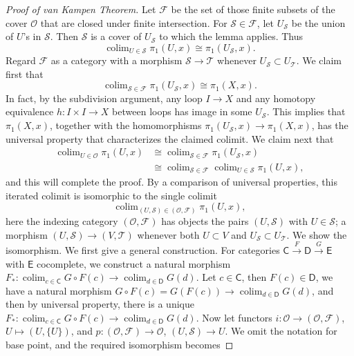 \documentclass[a4paper]{amsart}
\theoremstyle{plain}
\theoremstyle{definition}
\theoremstyle{remark}
\DeclareMathOperator*{\colim}{colim}
\begin{document}
\begin{proof}[Proof of van Kampen Theorem]
    Let $\mathscr{F}$ be the set of those finite subsets of the cover $\mathscr{O}$ that are closed under finite intersection.
    For $\mathscr{S}\in\mathscr{F}$, let $U_\mathscr{S}$ be the union of $U$'s in $\mathscr{S}$.
    Then $\mathscr{S}$ is a cover of $U_\mathscr{S}$ to which the lemma applies.
    Thus
    \[\colim_{U\in\mathscr{S}}\pi_1(U,x)\cong\pi_1(U_\mathscr{S},x).\]
    Regard $\mathscr{F}$ as a category with a morphism $\mathscr{S}\to\mathscr{T}$ whenever $U_\mathscr{S}\subset U_\mathscr{T}$.
    We claim first that
    \[\colim_{\mathscr{S}\in\mathscr{F}}\pi_1(U_\mathscr{S},x)\cong\pi_1(X,x).\]
    In fact, by the subdivision argument, any loop $I\to X$ and any homotopy equi\-valence $h:I\times I\to X$ between loops has image in some $U_\mathscr{S}$.
    This implies that $\pi_1(X,x)$, together with the homomorphisms $\pi_1(U_\mathscr{S},x)\to\pi_1(X,x)$, has the universal property that characterizes the claimed colimit.
    We claim next that
    \begin{align*}
        \colim_{U\in\mathscr{O}}\pi_1(U,x)&\cong\colim_{\mathscr{S}\in\mathscr{F}}\pi_1(U_\mathscr{S},x)\\
        &\cong\colim_{\mathscr{S}\in\mathscr{F}}\colim_{U\in\mathscr{S}}\pi_1(U,x),
    \end{align*}
    and this will complete the proof.
    By a comparison of universal properties, this iterated colimit is isomorphic to the single colimit
    \[\colim_{(U,\mathscr{S})\in(\mathscr{O},\mathscr{F})}\pi_1(U,x),\]
    here the indexing category $(\mathscr{O},\mathscr{F})$ has objects the pairs $(U,\mathscr{S})$ with $U\in\mathscr{S}$; a morphism $(U,\mathscr{S})\to(V,\mathscr{T})$ whenever both $U\subset V$ and $U_\mathscr{S}\subset U_\mathscr{T}$.
    We show the isomorphism.
    We first give a general construction.
    For categories $\mathsf{C}\xrightarrow{F}\mathsf{D}\xrightarrow{G}\mathsf{E}$ with $\mathsf{E}$ cocomplete, we construct a natural morphism $F_*:\colim_{c\in\mathsf{C}}G\circ F(c)\to\colim_{d\in\mathsf{D}}G(d)$.
    Let $c\in\mathsf{C}$, then $F(c)\in\mathsf{D}$, we have a natural morphism $G\circ F(c)=G(F(c))\to\colim_{d\in\mathsf{D}}G(d)$, and then by universal property, there is a unique $F_*:\colim_{c\in\mathsf{C}}G\circ F(c)\to\colim_{d\in\mathsf{D}}G(d)$.
    Now let functors $i:\mathscr{O}\to(\mathscr{O},\mathscr{F})$, $U\mapsto(U,\{U\})$, and $p:(\mathscr{O},\mathscr{F})\to\mathscr{O}$, $(U,\mathscr{S})\to U$.
    We omit the notation for base point, and the required isomorphism becomes

\end{proof}
\end{document}
